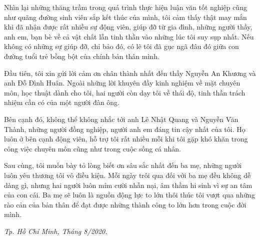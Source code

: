 \cleardoublepage
{}

\begin{dedication}
Nhìn lại những thăng trầm trong quá trình thực hiện luận văn tốt nghiệp cũng như quãng đường sinh viên sắp kết thúc của mình, tôi cảm thấy thật may mắn khi đã nhận được rất nhiều sự động viên, giúp đỡ từ gia đình, những người thầy, anh em, bạn bè về cả vật chất lẫn tinh thần vào những lúc tôi suy sụp nhất. Nếu không có những sự giúp đỡ, chỉ bảo đó, có lẽ tôi đã gục ngã đâu đó giữa con đường tuổi trẻ bồng bột của chính bản thân mình.\par
Đầu tiên, tôi xin gửi lời cảm ơn chân thành nhất đến thầy Nguyễn An Khương và anh Đỗ Đình Huân. Ngoài những lời khuyên đầy kinh nghiệm về mặt chuyên môn, học thuật dành cho tôi, hai người còn dạy tôi về thái độ, tinh thần trách nhiệm cần có của một người đàn ông.\par
Bên cạnh đó, không thể không nhắc tới anh Lê Nhật Quang và Nguyễn Văn Thành, những người đồng nghiệp, người anh em đáng tin cậy nhất của tôi. Họ luôn ở bên cạnh động viên, hỗ trợ tôi rất nhiều mỗi khi tôi gặp khó khăn trong công việc chuyên môn cũng như trong cuộc sống cá nhân.\par
Sau cùng, tôi muốn bày tỏ lòng biết ơn sâu sắc nhất đến ba mẹ, những người luôn yêu thương tôi vô điều kiện. Mỗi ngày trôi qua đối với ba mẹ đều không dễ dàng gì, nhưng hai người luôn mỉm cười nhẫn nại, âm thầm hi sinh vì sự an tâm của con cái. Ba mẹ sẽ luôn là nguồn động lực to lớn thôi thúc tôi vượt qua những rào cản của bản thân để đạt được những thành công to lớn hơn trong cuộc đời mình.
\begin{flushright}
    \textit{Tp. Hồ Chí Minh, Tháng 8/2020.}
\end{flushright}
\end{dedication}
